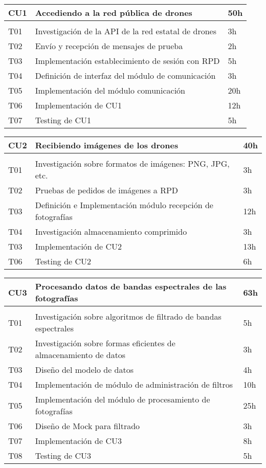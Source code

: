 \begin{table}[h!]
    \begin{tabular}{lll}
	\hline
	CU1 & Accediendo a la red pública de drones & 50h \\
	\hline \\
	T01 & Investigación de la API  de la red estatal de drones & 3h \\
	T02 & Envío y recepción de mensajes de prueba & 2h \\
	T03 & Implementación establecimiento de sesión con RPD & 5h \\
	T04 & Definición de interfaz del módulo de comunicación & 3h \\
	T05 & Implementación del módulo comunicación & 20h \\
	T06 & Implementación de CU1 & 12h \\
	T07 & Testing de CU1 & 5h \\
	\hline
    \end{tabular}
\end{table}

\begin{table}[h!]
    \begin{tabular}{lll}
	\hline
	CU2 &  Recibiendo imágenes de los drones & 40h \\
	\hline \\
	T01 & Investigación sobre formatos de imágenes: PNG, JPG, etc. & 3h \\
	T02 & Pruebas de pedidos de imágenes a RPD & 3h \\
	T03 & Definición e Implementación módulo recepción de fotografías & 12h \\
	T04 & Investigación almacenamiento comprimido & 3h \\
	T03 & Implementación de CU2 & 13h \\
	T06 & Testing de CU2 & 6h \\
	\hline
    \end{tabular}
\end{table}

\begin{table}[h!]
    \begin{tabular}{lll}
	\hline
	CU3 & Procesando datos de bandas espectrales de las fotografías & 63h \\
	\hline \\
	T01 & Investigación sobre algoritmos de filtrado de bandas espectrales & 5h \\
	T02 & Investigación sobre formas eficientes de almacenamiento de datos & 3h \\
	T03 & Diseño del modelo de datos & 4h \\
	T04 & Implementación de módulo de administración de filtros & 10h \\
	T05 & Implementación del módulo de procesamiento de fotografías & 25h \\
	T06 & Diseño de Mock para filtrado & 3h \\
	T07 & Implementación de CU3 & 8h \\
	T08 & Testing de CU3 & 5h \\
	\hline
    \end{tabular}
\end{table}

